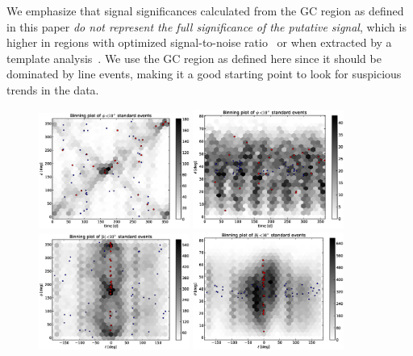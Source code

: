 \documentclass[aps,twocolumn,prd,superscriptaddress,showpacs,nofootinbib,fixfloat]{revtex4}
\begin{document}
We emphasize that signal significances calculated from the GC region as
defined in this paper \emph{do not represent the full significance of the
  putative signal}, which is higher in regions with optimized signal-to-noise
ratio~\cite{Weniger:2012} or when extracted by a template
analysis~\cite{linepaper}. We use the GC region as defined here since it
should be dominated by line events, making it a good starting point to look
for suspicious trends in the data.


% 

\begin{figure}
  \centering
  \includegraphics[width=0.44\textwidth]{plots/TIME_PHI.eps}
  \includegraphics[width=0.44\textwidth]{plots/TIME_THETA.eps}
  \includegraphics[width=0.44\textwidth]{plots/L_PHI.eps}
  \includegraphics[width=0.44\textwidth]{plots/L_THETA.eps}

\end{figure}
\end{document}
